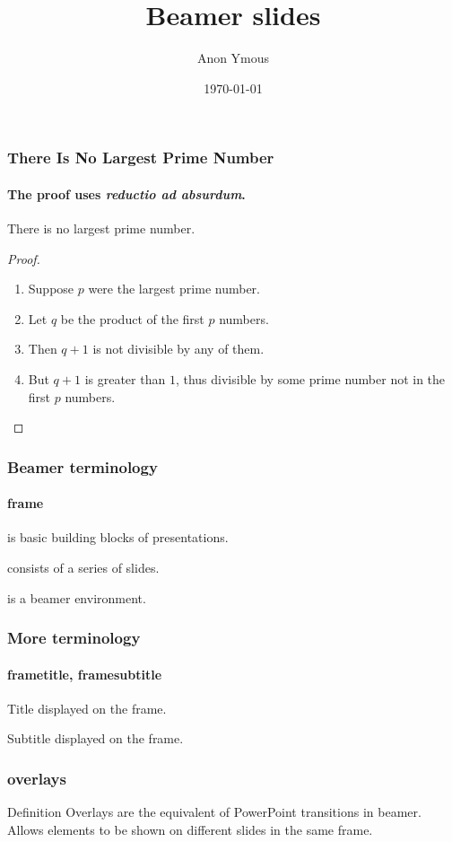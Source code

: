 \documentclass{beamer}
\author{Anon Ymous}
\date{\today}
\title{Beamer slides}
\begin{document}
\begin{frame}
    \frametitle{There Is No Largest Prime Number}
    \framesubtitle{The proof uses \textit{reductio ad absurdum}.}
    \begin{theorem}
        There is no largest prime number.
    \end{theorem}
    \begin{proof}
        \begin{enumerate}
            \item<1-| alert@1> Suppose $p$ were the largest prime number.
            \item<2-> Let $q$ be the product of the first $p$ numbers.
            \item<3-> Then $q+1$ is not divisible by any of them.
            \item<1-> But $q + 1$ is greater than $1$, thus divisible by some prime
            number not in the first $p$ numbers.\qedhere
        \end{enumerate}
    \end{proof}
\end{frame}
\begin{frame}
    \frametitle{Beamer terminology}
    \framesubtitle{frame}
    \begin{description}
        \item<1-| alert@1>[frame] is basic building blocks of presentations.
        \item<2-| alert@2>[frame] consists of a series of slides.
        \item<3-| alert@3>[frame] is a beamer environment.
    \end{description}
\end{frame}
\begin{frame}
    \frametitle{More terminology}
    \framesubtitle{frametitle, framesubtitle}
    \begin{description}
        \item<1-| alert@1>[frametitle] Title displayed on the frame.
        \item<2-| alert@2>[framesubtitle] Subtitle displayed on the frame.
    \end{description}
\end{frame}
\begin{frame}
    \frametitle{overlays}
    \begin{block}{Definition}
        \alert{Overlays} are the equivalent of PowerPoint transitions in beamer.
        Allows elements to be shown on different slides in the same frame.
    \end{block}
\end{frame}
\end{document}
